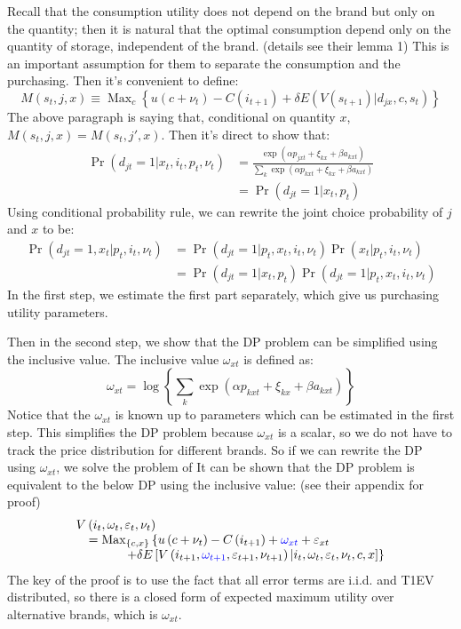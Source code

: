 Recall that the consumption utility does not depend on the brand but only on the quantity; then it is natural that the optimal consumption depend only on the quantity of storage, independent of the brand. (details see their lemma 1)
This is an important assumption for them to separate the consumption and the purchasing. 
Then it's convenient to define:
\[
    M\left(s_{t}, j, x\right)
    \equiv \operatorname{Max}_{c}\left\{u\left(c+\nu_{t}\right)-C\left(i_{t+1}\right)+\delta E\left(V\left(s_{t+1}\right) | d_{j x}, c, s_{t}\right)\right\}
\]
The above paragraph is saying that, conditional on quantity $x$, $M(s_t,j,x)=M(s_t,j',x)$.
Then it's direct to show that:
\[
  \begin{aligned} \operatorname{Pr}\left(d_{j t}=1 | x_{t}, i_{t}, p_{t}, \nu_{t}\right) &=\frac{\exp \left(\alpha p_{j x t}+\xi_{k x}+\beta a_{k x t}\right)}{\sum_{k} \exp \left(\alpha p_{k x t}+\xi_{k x}+\beta a_{k x t}\right)} \\ &=\operatorname{Pr}\left(d_{j t}=1 | x_{t}, p_{t}\right) \end{aligned}  
\]
Using conditional probability rule, we can rewrite the joint choice probability of $j$ and $x$ to be:
\begin{align*}
\operatorname{Pr}\left(d_{j t}=1, x_{t} | p_{t}, i_{t}, \nu_{t}\right)&=
\operatorname{Pr}\left(d_{j t}=1 | p_{t}, x_{t}, i_{t}, \nu_{t}\right) 
\operatorname{Pr}\left(x_{t} | p_{t}, i_{t}, \nu_{t}\right) \\
&= \operatorname{Pr}\left(d_{j t}=1 | x_{t}, p_{t}\right) 
\operatorname{Pr}\left(d_{j t}=1 | p_{t}, x_{t}, i_{t}, \nu_{t}\right) 
\end{align*}
In the first step, we estimate the first part separately, which give us purchasing utility parameters.

Then in the second step, we show that the DP problem can be simplified using the inclusive value.
The inclusive value $\omega_{xt}$ is defined as:
\[
    \omega_{x t}=\log \left\{\sum_{k} \exp \left(\alpha p_{k x t}+\xi_{k x}+\beta a_{k x t}\right)\right\}
\]
Notice that the $\omega_{xt}$ is known up to parameters which can be estimated in the first step.
This simplifies the DP problem because $\omega_{xt}$ is a scalar, so we do not have to track the price distribution for different brands.
So if we can rewrite the DP using $\omega_{xt}$, we solve the problem of 
It can be shown that the DP problem is equivalent to the below DP using the inclusive value: (see their appendix for proof)
\[
    \begin{array}{l}{V\left(i_{t}, \omega_{t}, \varepsilon_{t}, \nu_{t}\right)} \\ {\quad=\operatorname{Max}_{\{c, x\}}\left\{u\left(c+\nu_{t}\right)-C\left(i_{t+1}\right)+{\color{blue} \omega_{x t}}+\varepsilon_{x t}\right.} \\ 
    \quad \quad \quad {\left.\quad+\delta E\left[V\left(i_{t+1}, {\color{blue} \omega_{t+1}}, \varepsilon_{t+1}, \nu_{t+1}\right) | i_{t}, \omega_{t}, \varepsilon_{t}, \nu_{t}, c, x\right]\right\}}\end{array}
\]
The key of the proof is to use the fact that all error terms are i.i.d. and T1EV distributed, so there is a closed form of expected maximum utility over alternative brands, which is $\omega_{xt}$.

